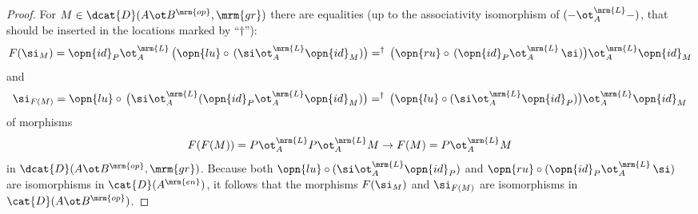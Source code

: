 \begin{proof}
For $M \in \dcat{D}(A \ot B^{\mrm{op}}, \mrm{gr})$ there are equalities
(up to the associativity isomorphism of $(- \ot_A^{\mrm{L}} -)$, 
that should be inserted in the locations marked by ``$\dag$''): 
\begin{equation} \label{eqn:4006}
F(\si_M) = \opn{id}_P \ot_A^{\mrm{L}} \, 
\bigl( \opn{lu} \circ \, (\si \ot_{A}^{\mrm{L}} \opn{id}_M) \bigr) 
=^{\dag} \, 
\bigl( \opn{ru} \circ \, (\opn{id}_P \ot_A^{\mrm{L}} \, \si) \bigr)
\ot_{A}^{\mrm{L}} \opn{id}_M 
\end{equation}
and 
\begin{equation} \label{eqn:3996}
\si_{F(M)} = \opn{lu} \circ \, \bigl( \si \ot_A^{\mrm{L}} 
(\opn{id}_P \ot_A^{\mrm{L}} \opn{id}_M) \bigr) 
=^{\dag} \, 
\bigl( \opn{lu} \circ (\si \ot_A^{\mrm{L}} \opn{id}_P) \bigr) \ot_A^{\mrm{L}} 
\opn{id}_M 
\end{equation}
of morphisms
\[ F(F(M)) = P \ot_A^{\mrm{L}} P \ot_A^{\mrm{L}} M \to 
F(M) =  P \ot_A^{\mrm{L}} M  \]
in $\dcat{D}(A \ot B^{\mrm{op}}, \mrm{gr})$.
Because both $\opn{lu} \circ (\si \ot_A^{\mrm{L}} \opn{id}_P)$ and 
$\opn{ru} \circ (\opn{id}_P \ot_A^{\mrm{L}} \, \si)$ 
are isomorphisms in $\cat{D}(A^{\mrm{en}})$, it follows that the morphisms
$F(\si_M)$ and $\si_{F(M)}$ are isomorphisms in 
$\cat{D}(A \ot B^{\mrm{op}})$. 


\end{proof}

